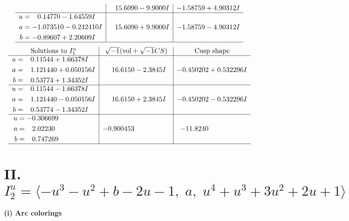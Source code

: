\documentclass[1p]{elsarticle_modified}
\theoremstyle{definition}
\newcommand{\I}{\sqrt{-1}}
\begin{document}
$$\begin{array}{c|c|c}
 & \phantom{-}15.6090 - 9.9000 I & -1.58759 + 4.90312 I \\ \hline\begin{aligned}
u &= \phantom{-}0.14770 - 1.64559 I \\
a &= -1.073510 - 0.242410 I \\
b &= -0.89607 + 2.20609 I\end{aligned}
 & \phantom{-}15.6090 + 9.9000 I & -1.58759 - 4.90312 I\\
 \hline 
 \end{array}$$\newpage$$\begin{array}{c|c|c}  
\text{Solutions to }I^u_{1}& \I (\text{vol} + \sqrt{-1}CS) & \text{Cusp shape}\\
 \hline 
\begin{aligned}
u &= \phantom{-}0.11544 + 1.66378 I \\
a &= \phantom{-}1.121440 + 0.050156 I \\
b &= \phantom{-}0.53774 + 1.34352 I\end{aligned}
 & \phantom{-}16.6150 - 2.3845 I & -0.450202 + 0.532296 I \\ \hline\begin{aligned}
u &= \phantom{-}0.11544 - 1.66378 I \\
a &= \phantom{-}1.121440 - 0.050156 I \\
b &= \phantom{-}0.53774 - 1.34352 I\end{aligned}
 & \phantom{-}16.6150 + 2.3845 I & -0.450202 - 0.532296 I \\ \hline\begin{aligned}
u &= -0.306699\phantom{ +0.000000I} \\
a &= \phantom{-}2.02230\phantom{ +0.000000I} \\
b &= \phantom{-}0.747269\phantom{ +0.000000I}\end{aligned}
 & -0.900453\phantom{ +0.000000I} & -11.8240\phantom{ +0.000000I}\\
 \hline 
 \end{array}$$\newpage\newpage\renewcommand{\arraystretch}{1}
\centering \section*{II. $I^u_{2}= \langle - u^3- u^2+b-2 u-1,\;a,\;u^4+u^3+3 u^2+2 u+1 \rangle$}
\flushleft \textbf{(i) Arc colorings}\\
\end{document}
